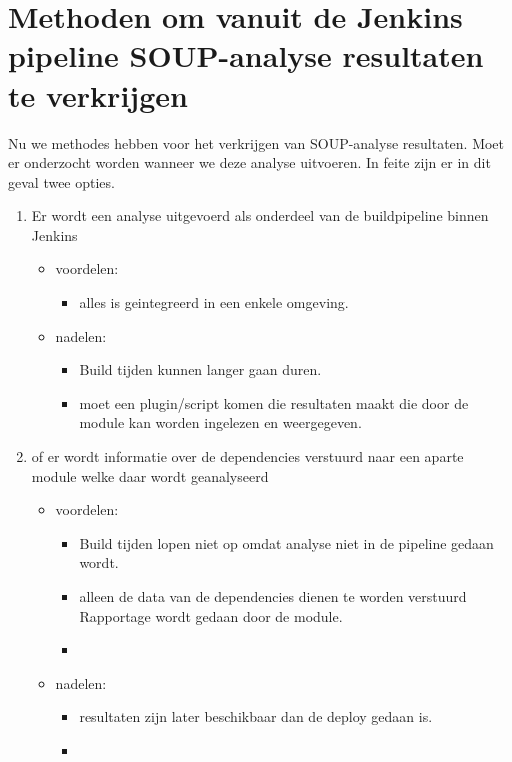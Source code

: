 \section{Methoden om vanuit de Jenkins pipeline SOUP-analyse resultaten te verkrijgen}\label{sec:methoden-om-vanuit-de-jenkins-pipeline-soup-analyse-resultaten-te-verkrijgen}
Nu we methodes hebben voor het verkrijgen van SOUP-analyse resultaten. Moet er onderzocht worden wanneer we deze analyse uitvoeren. In feite zijn er in dit geval twee opties.
\begin{enumerate}
    \item Er wordt een analyse uitgevoerd als onderdeel van de buildpipeline binnen Jenkins
    \begin{itemize}
        \item voordelen:
        \begin{itemize}
            \item alles is geintegreerd in een enkele omgeving.
        \end{itemize}
        \item nadelen:
        \begin{itemize}
            \item Build tijden kunnen langer gaan duren.
            \item moet een plugin/script komen die resultaten maakt die door de module kan worden ingelezen en weergegeven.
        \end{itemize}
    \end{itemize}
    \item of er wordt informatie over de dependencies verstuurd naar een aparte module welke daar wordt geanalyseerd
    \begin{itemize}
        \item voordelen:
        \begin{itemize}
            \item Build tijden lopen niet op omdat analyse niet in de pipeline gedaan wordt.
            \item alleen de data van de dependencies dienen te worden verstuurd Rapportage wordt gedaan door de module.
            \item
        \end{itemize}
        \item nadelen:
        \begin{itemize}
            \item resultaten zijn later beschikbaar dan de deploy gedaan is.
            \item
        \end{itemize}
    \end{itemize}
\end{enumerate}


